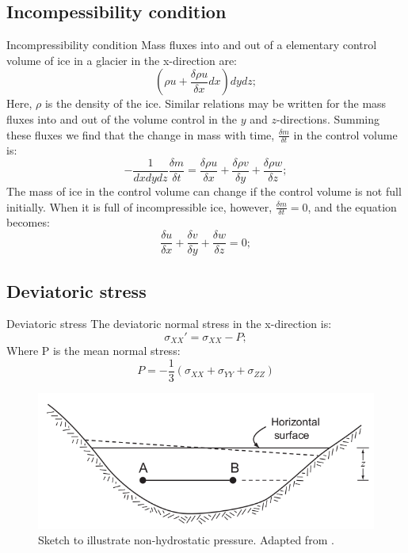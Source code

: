 \documentclass[11pt]{beamer}
\begin{document}
	\subsection{Incompessibility condition}
		\begin{frame}{Incompressibility condition}
		\justifying
		Mass fluxes into and out of a elementary control volume of ice in a glacier in the x-direction are:
		\begin{equation}
			({\rho u + \frac{\delta \rho u}{\delta x}dx})dy dz;
		\end{equation}
		Here, $\rho$ is the density of the ice. Similar relations may be written for the mass fluxes into and out of the volume control in the $y$ and $z$-directions. Summing these fluxes we find that the change in mass with time, $\frac{\delta m}{\delta t}$ in the control volume is:
		\begin{equation}
			-\frac{1}{dxdydz}\frac{\delta m}{\delta t}=\frac{\delta \rho u}{\delta x}+\frac{\delta \rho v}{\delta y}+\frac{\delta \rho w}{\delta z};
		\end{equation}
		The mass of ice in the control volume can change if the control volume is not full initially. When it is full of incompressible ice, however, $\frac{\delta m}{\delta t}=0$, and the equation becomes:
		\begin{equation}
			\frac{\delta u}{\delta x}+\frac{\delta v}{\delta y}+\frac{\delta w}{\delta z}=0;
		\end{equation}
		\end{frame}
	\subsection{Deviatoric stress}
		\begin{frame}{Deviatoric stress}
		\justifying
		The deviatoric normal stress in the x-direction is:
		\begin{equation}
			\sigma_{XX}'= \sigma_{XX}-P;
		\end{equation}
		Where P is the mean normal stress:
		\begin{equation}
			P=-\frac{1}{3}({\sigma_{XX}+\sigma_{YY}+\sigma_{ZZ}})
		\end{equation}
		\begin{figure}
			\centering
			\includegraphics[width=0.4\linewidth]{../fig/Non_hydrostatic_pressure.png}
			\caption{Sketch to illustrate non-hydrostatic pressure. Adapted from \cite{hooke2019principles}.}
			\label{Deviatoric_stress}
		\end{figure}
		\end{frame}
\end{document}

